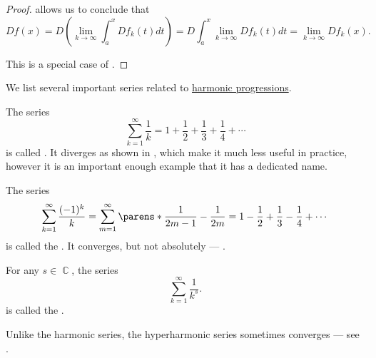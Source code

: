 \begin{proof}
   allows us to conclude that
  \begin{equation*}
    D f(x)
    =
    D\left(\lim_{k \to \infty} \int_a^x D f_k(t) dt \right)
    =
    D \int_a^x \lim_{k \to \infty} D f_k(t) dt
    =
    \lim_{k \to \infty} D f_k(x).
  \end{equation*}

   This is a special case of .
\end{proof}

\begin{example}\label{ex:harmonic_series}
  We list several important series related to \hyperref[def:harmonic_progression]{harmonic progressions}.

  \begin{thmenum}
     The series
    \begin{equation}\label{eq:ex:harmonic_series/harmonic}
      \sum_{k=1}^\infty \frac 1 k = 1 + \frac 1 2 + \frac 1 3 + \frac 1 4 + \cdots
    \end{equation}
    is called  . It diverges as shown in , which make it much less useful in practice, however it is an important enough example that it has a dedicated name.

     The series
    \begin{equation}\label{eq:ex:harmonic_series/alternating}
      \sum_{k=1}^\infty \frac {(-1)^k} k
      =
      \sum_{m=1}^\infty \parens*{ \frac 1 {2m - 1} - \frac 1 {2m} }
      =
      1 - \frac 1 2 + \frac 1 3 - \frac 1 4 + \cdots
    \end{equation}
    is called the . It converges, but not absolutely --- .

     For any \( s \in \BbbC \), the series
    \begin{equation}\label{eq:ex:harmonic_series/hyperharmonic}
      \sum_{k=1}^\infty \frac 1 {k^s}.
    \end{equation}
    is called the .

    Unlike the harmonic series, the hyperharmonic series sometimes converges --- see .
  \end{thmenum}
\end{example}

